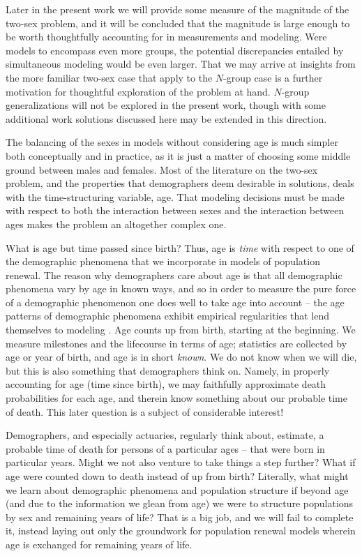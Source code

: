 Later in the
present work we will provide some measure of the magnitude of the two-sex problem, 
and it will be concluded that the
magnitude is large enough to be worth thoughtfully accounting for in
measurements and modeling. Were models to encompass even more groups, the potential
discrepancies entailed by simultaneous modeling would be even larger. That we may arrive at
insights from the more familiar two-sex case that apply to the $N$-group case is
a further motivation for thoughtful exploration of the problem at hand.
$N$-group generalizations will not be explored in the present work, though with
some additional work solutions discussed here may be extended in this
direction.

The balancing of the sexes in models without considering age is
much simpler both conceptually and in practice, as it is just a matter of
choosing some middle ground between males and females. Most of the literature on
the two-sex problem, and the properties that demographers deem desirable in
solutions, deals with the time-structuring variable, age. That modeling
decisions must be made with respect to both the interaction between sexes and
the interaction between ages makes the problem an altogether complex one. 

What is age but time passed since birth? Thus, age is \textit{time} with respect
to one of the demographic phenomena that we incorporate in models of population
renewal. The reason why demographers care about age is that all
demographic phenomena vary by age in known ways, and so in order to measure the
pure force of a demographic phenomenon one does well to take age into account --
the age patterns of demographic phenomena exhibit empirical regularities that lend themselves to
modeling \citep{coale1996development}. Age counts 
up from birth, starting at the beginning. We measure milestones and the lifecourse in 
terms of age; statistics are collected by age or year of birth, and age is in 
short \textit{known}. We do not know when we will die, but
this is also something that demographers think on. Namely, in properly
accounting for age (time since birth), we may faithfully approximate death
probabilities for each age, and therein know something about our probable time
of death. This later question is a subject of considerable interest!

Demographers, and especially actuaries, regularly think about, estimate, a
probable time of death for persons of a particular ages -- that were born in
particular years. Might we not also venture to take things a step further?
What if age were counted down to death instead of up
from birth? Literally, what might we learn about demographic phenomena and
population structure if beyond age (and due to the information we glean from
age) we were to structure populations by sex and remaining years of life? That
is a big job, and we will fail to complete it, instead laying out only the groundwork
for population renewal models wherein age is exchanged for remaining years of
life.

